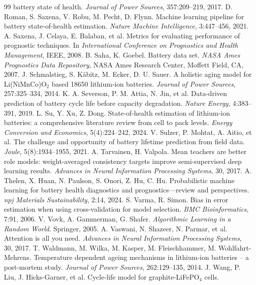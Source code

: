 \documentclass[12pt,a4paper,oneside]{report}
\theoremstyle{plain}
\theoremstyle{definition}
\begin{document}
\begin{thebibliography}{99}
  battery state of health. \emph{Journal of Power Sources}, 357:209--219, 2017.
 D. Roman, S. Saxena, V. Robu, M. Pecht, D. Flynn. Machine learning pipeline for battery
  state-of-health estimation. \emph{Nature Machine Intelligence}, 3:447--456, 2021.
 A. Saxena, J. Celaya, E. Balaban, et al. Metrics for evaluating performance of prognostic
  techniques. In \emph{International Conference on Prognostics and Health Management}, IEEE, 2008.
 B. Saha, K. Goebel. Battery data set. \emph{NASA Ames Prognostics Data Repository}, NASA
  Ames Research Center, Moffett Field, CA, 2007.
 J. Schmalstieg, S. Käbitz, M. Ecker, D. U. Sauer. A holistic aging model for
  Li(NiMnCo)O$_2$ based 18650 lithium-ion batteries. \emph{Journal of Power Sources}, 257:325--334, 2014.
 K. A. Severson, P. M. Attia, N. Jin, et al. Data-driven prediction of battery cycle life before
  capacity degradation. \emph{Nature Energy}, 4:383--391, 2019.
 L. Su, Y. Xu, Z. Dong. State-of-health estimation of lithium-ion batteries: a comprehensive
  literature review from cell to pack levels. \emph{Energy Conversion and Economics}, 5(4):224--242, 2024.
 V. Sulzer, P. Mohtat, A. Aitio, et al. The challenge and opportunity of battery lifetime
  prediction from field data. \emph{Joule}, 5(8):1934--1955, 2021.
 A. Tarvainen, H. Valpola. Mean teachers are better role models: weight-averaged consistency
  targets improve semi-supervised deep learning results. \emph{Advances in Neural Information Processing Systems},
  30, 2017.
 A. Thelen, X. Huan, N. Paulson, S. Onori, Z. Hu, C. Hu. Probabilistic machine learning for
  battery health diagnostics and prognostics---review and perspectives. \emph{npj Materials Sustainability}, 2:14,
  2024.
 S. Varma, R. Simon. Bias in error estimation when using cross-validation for model selection.
  \emph{BMC Bioinformatics}, 7:91, 2006.
 V. Vovk, A. Gammerman, G. Shafer. \emph{Algorithmic Learning in a Random World}. Springer, 2005.
 A. Vaswani, N. Shazeer, N. Parmar, et al. Attention is all you need. \emph{Advances in Neural
  Information Processing Systems}, 30, 2017.
 T. Waldmann, M. Wilka, M. Kasper, M. Fleischhammer, M. Wohlfahrt-Mehrens. Temperature
  dependent ageing mechanisms in lithium-ion batteries -- a post-mortem study. \emph{Journal of Power Sources},
  262:129--135, 2014.
 J. Wang, P. Liu, J. Hicks-Garner, et al. Cycle-life model for graphite-LiFePO$_4$ cells.

\end{thebibliography}
\end{document}
